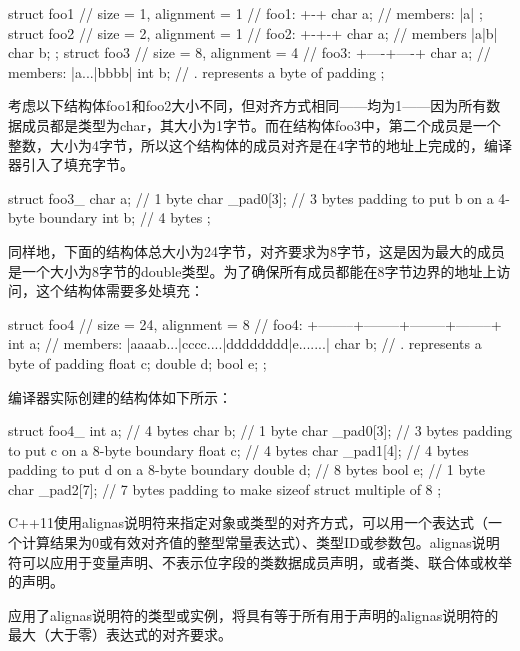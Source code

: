 \begin{cpp}
struct foo1 // size = 1, alignment = 1
{                // foo1:    +-+
    char a;      // members: |a|
};
struct foo2 // size = 2, alignment = 1
{                // foo2:    +-+-+
    char a;      // members  |a|b|
    char b;
};
struct foo3 // size = 8, alignment = 4
{                // foo3:    +----+----+
    char a;      // members: |a...|bbbb|
    int  b;      // . represents a byte of padding
};
\end{cpp}

考虑以下结构体foo1和foo2大小不同，但对齐方式相同——均为1——因为所有数据成员都是类型为char，其大小为1字节。而在结构体foo3中，第二个成员是一个整数，大小为4字节，所以这个结构体的成员对齐是在4字节的地址上完成的，编译器引入了填充字节。

\begin{cpp}
struct foo3_
{
    char a;        // 1 byte
    char _pad0[3]; // 3 bytes padding to put b on a 4-byte boundary
    int  b;        // 4 bytes
};
\end{cpp}

同样地，下面的结构体总大小为24字节，对齐要求为8字节，这是因为最大的成员是一个大小为8字节的double类型。为了确保所有成员都能在8字节边界的地址上访问，这个结构体需要多处填充：

\begin{cpp}
struct foo4 // size = 24, alignment = 8
{                 // foo4:    +--------+--------+--------+--------+
    int a;        // members: |aaaab...|cccc....|dddddddd|e.......|
    char b;       // . represents a byte of padding
    float c;
    double d;
    bool e;
};
\end{cpp}

编译器实际创建的结构体如下所示：

\begin{cpp}
struct foo4_
{
    int a;         // 4 bytes
    char b;        // 1 byte
    char _pad0[3]; // 3 bytes padding to put c on a 8-byte boundary
    float c;       // 4 bytes
    char _pad1[4]; // 4 bytes padding to put d on a 8-byte boundary
    double d;      // 8 bytes
    bool e;        // 1 byte
    char _pad2[7]; // 7 bytes padding to make sizeof struct multiple of 8
};
\end{cpp}

C++11使用alignas说明符来指定对象或类型的对齐方式，可以用一个表达式（一个计算结果为0或有效对齐值的整型常量表达式）、类型ID或参数包。alignas说明符可以应用于变量声明、不表示位字段的类数据成员声明，或者类、联合体或枚举的声明。

应用了alignas说明符的类型或实例，将具有等于所有用于声明的alignas说明符的最大（大于零）表达式的对齐要求。

